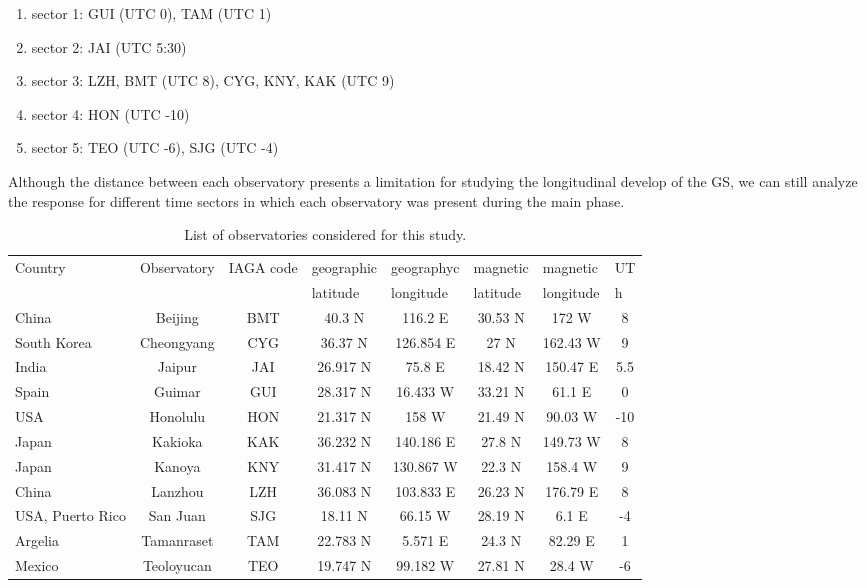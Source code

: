 \documentclass[a4paper]{article}
\theoremstyle{plain}
\theoremstyle{definition}
\begin{document}
	\begin{enumerate}
		\item sector 1: GUI (UTC 0), TAM (UTC 1) 
		\item sector 2: JAI (UTC 5:30)
		\item sector 3: LZH, BMT (UTC 8), CYG, KNY, KAK (UTC 9)
		\item sector 4: HON (UTC -10)
		\item sector 5: TEO (UTC -6), SJG (UTC -4) 
	\end{enumerate}
	
	Although the distance between each observatory presents a limitation for studying the longitudinal develop of the GS, we can still analyze the response for different time sectors in which each observatory was present during the main phase. 
	
\begin{table}[htbp]
	\caption{List of observatories considered for this study.}
	\begin{tabular}{lccccccc}
		\hline
		Country & \multicolumn{1}{l}{Observatory} & \multicolumn{1}{l}{IAGA code} & \multicolumn{1}{l}{geographic } & \multicolumn{1}{l}{geographyc } & \multicolumn{1}{l}{magnetic} & \multicolumn{1}{l}{magnetic } & \multicolumn{1}{l}{UT} \\ 
		& \multicolumn{1}{l}{} & \multicolumn{1}{l}{} & \multicolumn{1}{l}{latitude} & \multicolumn{1}{l}{longitude} & \multicolumn{1}{l}{latitude} & \multicolumn{1}{l}{longitude} & \multicolumn{1}{l}{h} \\ \hline
		China & Beijing & BMT & 40.3 N & 116.2 E & 30.53 N & 172 W & 8 \\ 
		South Korea & Cheongyang & CYG & 36.37 N & 126.854 E & 27 N & 162.43 W & 9 \\ 
		India & Jaipur & JAI & 26.917 N & 75.8 E & 18.42 N & 150.47 E & 5.5 \\ 
		Spain & Guimar & GUI & 28.317 N & 16.433 W & 33.21 N & 61.1 E & 0 \\ 
		USA & Honolulu & HON & 21.317 N & 158 W & 21.49 N & 90.03 W & -10 \\ 
		Japan & Kakioka & KAK & 36.232 N & 140.186 E & 27.8 N & 149.73 W & 8 \\ 
		Japan & Kanoya & KNY & 31.417 N & 130.867 W & 22.3 N & 158.4 W & 9 \\ 
		China & Lanzhou & LZH & 36.083 N & 103.833 E & 26.23 N & 176.79 E & 8 \\ 
		USA, Puerto Rico & San Juan & SJG & 18.11 N & 66.15 W & 28.19 N & 6.1 E & -4 \\ 
		Argelia & Tamanraset & TAM & 22.783 N & 5.571 E & 24.3 N & 82.29 E & 1 \\
		Mexico & Teoloyucan & TEO & 19.747 N & 99.182 W & 27.81 N & 28.4 W & -6 \\  \hline
	\end{tabular}
	\label{tab:obs}
\end{table}
\end{document}

